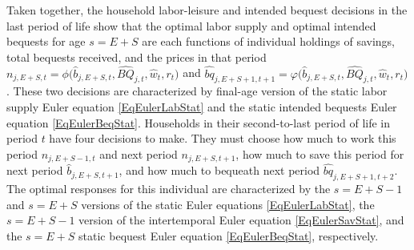 \documentclass[letterpaper,12pt]{article}
\theoremstyle{definition}
\begin{document}
    \begin{spacing}{1.5}
    \vspace{10mm}

    \noindent Taken together, the household labor-leisure and intended bequest decisions in the last period of life show that the optimal labor supply and optimal intended bequests for age $s=E+S$ are each functions of individual holdings of savings, total bequests received, and the prices in that period $n_{j,E+S,t}=\phi\bigl(\hat{b}_{j,E+S,t},\hat{BQ}_{j,t},\hat{w}_t,r_t\bigr)$ and $\hat{bq}_{j,E+S+1,t+1}=\varphi\bigl(\hat{b}_{j,E+S,t},\hat{BQ}_{j,t},\hat{w}_t,r_t\bigr)$. These two decisions are characterized by final-age version of the static labor supply Euler equation \eqref{EqEulerLabStat} and the static intended bequests Euler equation \eqref{EqEulerBeqStat}. Households in their second-to-last period of life in period $t$ have four decisions to make. They must choose how much to work this period $n_{j,E+S-1,t}$ and next period $n_{j,E+S,t+1}$, how much to save this period for next period $\hat{b}_{j,E+S,t+1}$, and how much to bequeath next period $\hat{bq}_{j,E+S+1,t+2}$. The optimal responses for this individual are characterized by the $s=E+S-1$ and $s=E+S$ versions of the static Euler equations \eqref{EqEulerLabStat}, the $s=E+S-1$ version of the intertemporal Euler equation \eqref{EqEulerSavStat}, and the $s=E+S$ static bequest Euler equation \eqref{EqEulerBeqStat}, respectively.


\end{spacing}
\end{document}
